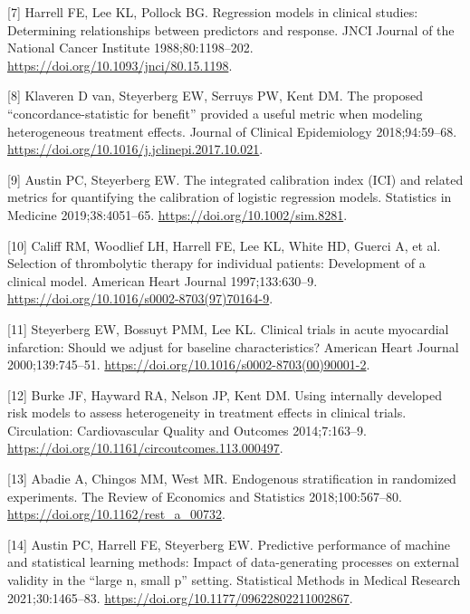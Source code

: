 \documentclass{article}
\newenvironment{cslreferences}%
  {}%
  {\par}
\begin{document}
\begin{cslreferences}
\leavevmode\hypertarget{ref-Harrell1988}{}%
{[}7{]} Harrell FE, Lee KL, Pollock BG. Regression models in clinical
studies: Determining relationships between predictors and response. JNCI
Journal of the National Cancer Institute 1988;80:1198--202.
\url{https://doi.org/10.1093/jnci/80.15.1198}.

\leavevmode\hypertarget{ref-vanKlaveren2018}{}%
{[}8{]} Klaveren D van, Steyerberg EW, Serruys PW, Kent DM. The proposed
``concordance-statistic for benefit'' provided a useful metric when
modeling heterogeneous treatment effects. Journal of Clinical
Epidemiology 2018;94:59--68.
\url{https://doi.org/10.1016/j.jclinepi.2017.10.021}.

\leavevmode\hypertarget{ref-Austin2019}{}%
{[}9{]} Austin PC, Steyerberg EW. The integrated calibration index (ICI)
and related metrics for quantifying the calibration of logistic
regression models. Statistics in Medicine 2019;38:4051--65.
\url{https://doi.org/10.1002/sim.8281}.

\leavevmode\hypertarget{ref-Califf1997}{}%
{[}10{]} Califf RM, Woodlief LH, Harrell FE, Lee KL, White HD, Guerci A,
et al. Selection of thrombolytic therapy for individual patients:
Development of a clinical model. American Heart Journal 1997;133:630--9.
\url{https://doi.org/10.1016/s0002-8703(97)70164-9}.

\leavevmode\hypertarget{ref-Steyerberg2000}{}%
{[}11{]} Steyerberg EW, Bossuyt PMM, Lee KL. Clinical trials in acute
myocardial infarction: Should we adjust for baseline characteristics?
American Heart Journal 2000;139:745--51.
\url{https://doi.org/10.1016/s0002-8703(00)90001-2}.

\leavevmode\hypertarget{ref-Burke2014}{}%
{[}12{]} Burke JF, Hayward RA, Nelson JP, Kent DM. Using internally
developed risk models to assess heterogeneity in treatment effects in
clinical trials. Circulation: Cardiovascular Quality and Outcomes
2014;7:163--9. \url{https://doi.org/10.1161/circoutcomes.113.000497}.

\leavevmode\hypertarget{ref-Abadie2018}{}%
{[}13{]} Abadie A, Chingos MM, West MR. Endogenous stratification in
randomized experiments. The Review of Economics and Statistics
2018;100:567--80. \url{https://doi.org/10.1162/rest_a_00732}.

\leavevmode\hypertarget{ref-Austin2021}{}%
{[}14{]} Austin PC, Harrell FE, Steyerberg EW. Predictive performance of
machine and statistical learning methods: Impact of data-generating
processes on external validity in the ``large n, small p'' setting.
Statistical Methods in Medical Research 2021;30:1465--83.
\url{https://doi.org/10.1177/09622802211002867}.


\end{cslreferences}
\end{document}
